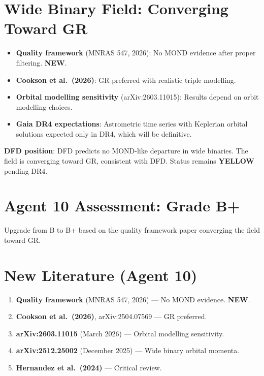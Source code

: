 \documentclass[11pt,a4paper]{article}
\newcommand{\YELLOW}{\textcolor{dfdyellow}{\textbf{YELLOW}}}
\newcommand{\NEW}{\textcolor{dfdblue}{\textbf{NEW}}}
\begin{document}
\section{Wide Binary Field: Converging Toward GR}

\begin{itemize}
\item \textbf{Quality framework} (MNRAS 547, 2026): No MOND evidence after proper filtering. \NEW.
\item \textbf{Cookson et al.\ (2026)}: GR preferred with realistic triple modelling.
\item \textbf{Orbital modelling sensitivity} (arXiv:2603.11015): Results depend on orbit modelling choices.
\item \textbf{Gaia DR4 expectations}: Astrometric time series with Keplerian orbital solutions expected only in DR4, which will be definitive.
\end{itemize}

\textbf{DFD position}: DFD predicts no MOND-like departure in wide binaries. The field is converging toward GR, consistent with DFD. Status remains \YELLOW{} pending DR4.

\section{Agent 10 Assessment: Grade B+}

Upgrade from B to B+ based on the quality framework paper converging the field toward GR.

\section{New Literature (Agent 10)}

\begin{enumerate}
\item \textbf{Quality framework} (MNRAS 547, 2026) --- No MOND evidence. \NEW.
\item \textbf{Cookson et al.\ (2026)}, arXiv:2504.07569 --- GR preferred.
\item \textbf{arXiv:2603.11015} (March 2026) --- Orbital modelling sensitivity.
\item \textbf{arXiv:2512.25002} (December 2025) --- Wide binary orbital momenta.
\item \textbf{Hernandez et al.\ (2024)} --- Critical review.
\end{enumerate}


\end{document}
